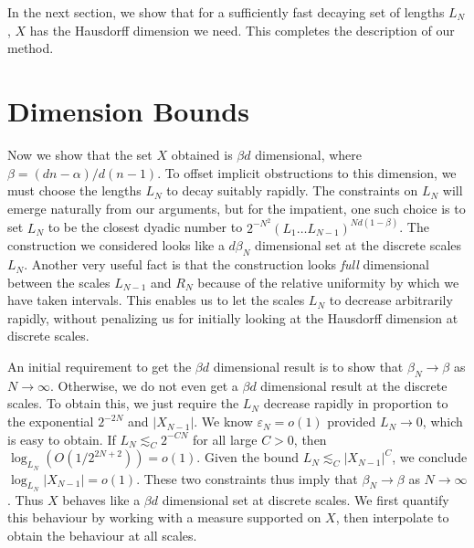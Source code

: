 \documentclass{article}
\theoremstyle{plain}
\theoremstyle{plain}
\begin{document}
\begin{multicols}{2}
%
%
In the next section, we show that for a sufficiently fast decaying set of lengths $L_N$, $X$ has the Hausdorff dimension we need. This completes the description of our method.

\section{Dimension Bounds}

Now we show that the set $X$ obtained is $\beta d$ dimensional, where $\beta = (dn - \alpha)/d(n-1)$. To offset implicit obstructions to this dimension, we must choose the lengths $L_N$ to decay suitably rapidly. The constraints on $L_N$ will emerge naturally from our arguments, but for the impatient, one such choice is to set $L_N$ to be the closest dyadic number to $2^{-N^2} \left( L_1 \dots L_{N-1} \right)^{Nd(1-\beta)}$. The construction we considered looks like a $d\beta_N$ dimensional set at the discrete scales $L_N$. Another very useful fact is that the construction looks {\it full} dimensional between the scales $L_{N-1}$ and $R_N$ because of the relative uniformity by which we have taken intervals. This enables us to let the scales $L_N$ to decrease arbitrarily rapidly, without penalizing us for initially looking at the Hausdorff dimension at discrete scales.

An initial requirement to get the $\beta d$ dimensional result is to show that $\beta_N \to \beta$ as $N \to \infty$. Otherwise, we do not even get a $\beta d$ dimensional result at the discrete scales. To obtain this, we just require the $L_N$ decrease rapidly in proportion to the exponential $2^{-2N}$ and $|X_{N - 1}|$. We know $\varepsilon_N = o(1)$ provided $L_N \to 0$, which is easy to obtain. If $L_N \lesssim_C 2^{-CN}$ for all large $C > 0$, then $\log_{L_N}(O(1/2^{2N+2})) = o(1)$. Given the bound $L_N \lesssim_C |X_{N-1}|^C$, we conclude $\log_{L_N} |X_{N-1}| = o(1)$. These two constraints thus imply that $\beta_N \to \beta$ as $N \to \infty$. Thus $X$ behaves like a $\beta d$ dimensional set at discrete scales. We first quantify this behaviour by working with a measure supported on $X$, then interpolate to obtain the behaviour at all scales.


\end{multicols}
\end{document}
